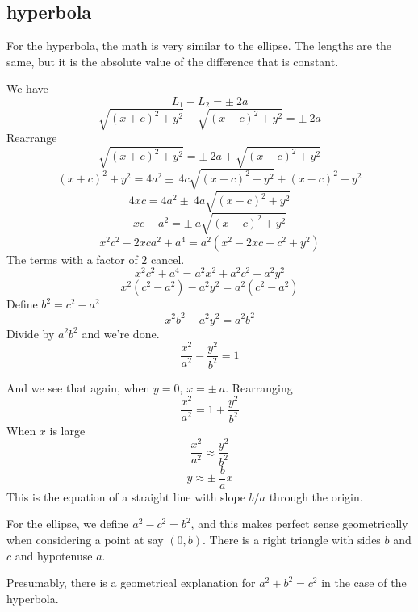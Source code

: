 \documentclass[11pt, oneside]{article}
\begin{document}
\subsection*{hyperbola}
For the hyperbola, the math is very similar to the ellipse.  The lengths are the same, but it is the absolute value of the difference that is constant.

We have
\[ L_1 - L_2 = \pm \ 2a \]
\[ \sqrt{(x + c)^2 + y^2} - \sqrt{(x - c)^2 + y^2} =  \pm \ 2a \]
Rearrange
\[ \sqrt{(x + c)^2 + y^2} =  \pm \  2a + \sqrt{(x - c)^2 + y^2} \]
\[ (x + c)^2 + y^2 = 4a^2 \pm \  4c \sqrt{(x + c)^2 + y^2} + (x - c)^2 + y^2 \]
\[ 4xc = 4a^2 \pm \ 4a \sqrt{(x - c)^2 + y^2}  \]
\[ xc - a^2 = \pm \ a \sqrt{(x - c)^2 + y^2}  \]
\[ x^2c^2 - 2xca^2 + a^4 = a^2(x^2 - 2xc + c^2 + y^2) \]
The terms with a factor of $2$ cancel.
\[ x^2c^2 + a^4 = a^2x^2 + a^2c^2 + a^2y^2 \]
\[ x^2(c^2 - a^2) - a^2 y^2 = a^2(c^2 - a^2) \]
Define $b^2 = c^2 - a^2$
\[ x^2 b^2 - a^2 y^2 = a^2 b^2 \]
Divide by $a^2b^2$ and we're done.
\[ \frac{x^2}{a^2} - \frac{y^2}{b^2} = 1 \]

And we see that again, when $y = 0$, $x = \pm \ a$.  Rearranging
\[ \frac{x^2}{a^2} = 1 + \frac{y^2}{b^2} \]
When $x$ is large
\[ \frac{x^2}{a^2} \approx \frac{y^2}{b^2} \]
\[ y \approx \pm \ \frac{b}{a} x \]
This is the equation of a straight line with slope $b/a$ through the origin.

For the ellipse, we define $a^2 - c^2 = b^2$, and this makes perfect sense geometrically when considering a point at say $(0,b)$.  There is a right triangle with sides $b$ and $c$ and hypotenuse $a$.

Presumably, there is a geometrical explanation for $a^2 + b^2 = c^2$ in the case of the hyperbola.
\end{document}
